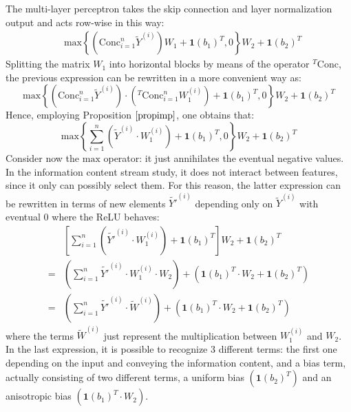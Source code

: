 \documentclass[11pt,a4paper,reqno]{amsart} %
\theoremstyle{definition}
\numberwithin{equation}{section}          %
\begin{document}
The multi-layer perceptron takes the skip connection and layer normalization output and acts row-wise in this way:
\begin{equation}
\begin{aligned}
&\mathrm{max}\left\{ \left( \mathrm{Conc}_{i=1}^n \widetilde{Y}^{(i)} \right) W_1 + \mathbf{1}(b_1)^T, 0 \right\} W_2 + \mathbf{1}(b_2)^T
\end{aligned}
\end{equation}
Splitting the matrix $W_1$ into horizontal blocks by means of the operator ${}^T \mathrm{Conc}$, the previous expression can be rewritten in a more convenient way as:
\begin{equation}
\mathrm{max}\left\{ \left( \mathrm{Conc}_{i=1}^n \widetilde{Y}^{(i)} \right) \cdot \left( {}^T \mathrm{Conc}_{i=1}^n W_1^{(i)} \right) + \mathbf{1}(b_1)^T, 0 \right\} W_2 +  \mathbf{1}(b_2)^T
\end{equation}
Hence, employing Proposition $\ref{propimp}$, one obtains that:
\begin{equation}
\mathrm{max}\left\{ \sum_{i=1}^n \left(\widetilde{Y}^{(i)} \cdot W_1^{(i)} \right) + \mathbf{1}(b_1)^T, 0 \right\} W_2 +  \mathbf{1}(b_2)^T
\end{equation}
Consider now the $\mathrm{max}$ operator: it just annihilates the eventual negative values. In the information content stream study, it does not interact between features, since it only can possibly select them. For this reason, the latter expression can be rewritten in terms of new elements $\widetilde{Y'}^{(i)}$ depending only on $\widetilde{Y}^{(i)}$ with eventual 0 where the ReLU behaves:
\begin{equation}
\begin{aligned}
&\left[ \sum_{i=1}^n \left(\widetilde{Y'}^{(i)} \cdot W_1^{(i)} \right) + \mathbf{1}(b_1)^T \right] W_2 +  \mathbf{1}(b_2)^T\\
=&\left(\sum_{i=1}^n \widetilde{Y'}^{(i)} \cdot W_1^{(i)} \cdot W_2 \right) +\left( \mathbf{1}(b_1)^T \cdot W_2 + \mathbf{1}(b_2)^T\right)\\
=&\left(\sum_{i=1}^n \widetilde{Y'}^{(i)} \cdot \widetilde{W}^{(i)} \right) +\left( \mathbf{1}(b_1)^T \cdot W_2 + \mathbf{1}(b_2)^T\right)
\end{aligned}
\end{equation}
where the terms $\widetilde{W}^{(i)}$ just represent the multiplication between $W_1^{(i)}$ and $W_2$. In the last expression, it is possible to recognize 3 different terms: the first one depending on the input and conveying the information content, and a bias term, actually consisting of two different terms, a uniform bias $(\mathbf{1}(b_2)^T)$ and an anisotropic bias $(\mathbf{1}(b_1)^T \cdot W_2)$.
\end{document}
